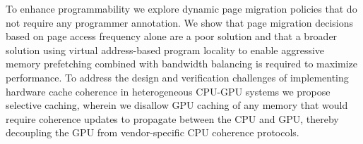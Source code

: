To enhance programmability we explore dynamic page migration policies that do
not require any programmer annotation.
We show that page migration decisions based on page access frequency
alone are a poor solution and that a broader solution using virtual
address-based program locality to enable aggressive memory prefetching combined
with bandwidth balancing is required to
maximize performance.
%
To address the design and verification challenges of implementing hardware cache
coherence in heterogeneous CPU-GPU systems 
we propose selective caching, wherein we disallow GPU caching of any memory that
would require coherence updates to propagate between the CPU and GPU, thereby
decoupling the GPU from vendor-specific CPU coherence protocols.

